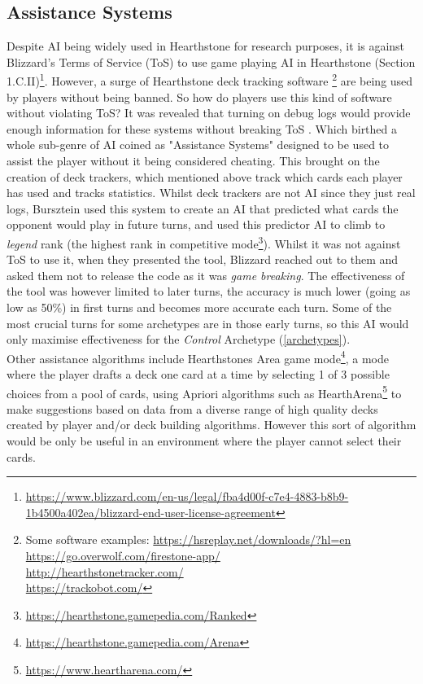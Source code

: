 \documentclass{report}
\begin{document}
\subsection{Assistance Systems}
Despite AI being widely used in Hearthstone for research purposes, it is against Blizzard's Terms of Service (ToS) to use game playing AI in Hearthstone (Section 1.C.II)\footnote{\url{https://www.blizzard.com/en-us/legal/fba4d00f-c7e4-4883-b8b9-1b4500a402ea/blizzard-end-user-license-agreement}}. However, a surge of Hearthstone deck tracking software \footnote{Some software examples: \url{https://hsreplay.net/downloads/?hl=en} \\ \url{https://go.overwolf.com/firestone-app/} \\ \url{http://hearthstonetracker.com/}  \\ \url{https://trackobot.com/}} are being used by players without being banned. So how do players use this kind of software without violating ToS? It was revealed that turning on debug logs would provide enough information for these systems without breaking ToS \cite{Flipperbw2014}. Which birthed a whole sub-genre of AI coined as "Assistance Systems" designed to be used to assist the player without it being considered cheating. This brought on the creation of deck trackers, which mentioned above track which cards each player has used and tracks statistics. Whilst deck trackers are not AI since they just real logs, Bursztein \cite{Bursztein2016} used this system to create an AI that predicted what cards the opponent would play in future turns, and used this predictor AI to climb to \textit{legend} rank (the highest rank in competitive mode\footnote{\url{https://hearthstone.gamepedia.com/Ranked}}). Whilst it was not against ToS to use it, when they presented the tool, Blizzard reached out to them and asked them not to release the code as it was \textit{game breaking}. The effectiveness of the tool was however limited to later turns, the accuracy is much lower (going as low as 50\%) in first turns and becomes more accurate each turn. Some of the most crucial turns for some archetypes are in those early turns, so this AI would only maximise effectiveness for the \textit{Control} Archetype (\ref{archetypes}). \\
\indent Other assistance algorithms include Hearthstones Area game mode\footnote{\url{https://hearthstone.gamepedia.com/Arena}}, a mode where the player drafts a deck one card at a time by selecting 1 of 3 possible choices from a pool of cards, using Apriori algorithms \cite{Agrawal1994} such as HearthArena\footnote{\url{https://www.heartharena.com/}} to make suggestions based on  data from a diverse range of high quality decks created by player and/or deck building algorithms\cite{MapElites}. However this sort of algorithm would be only be useful in an environment where the player cannot select their cards. \\ 
\end{document}
